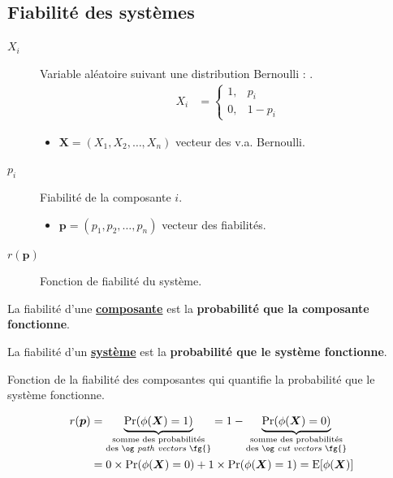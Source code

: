 \documentclass[french]{article}
\begin{document}
\begin{multicols*}{2}
\subsection{Fiabilité des systèmes}
\begin{distributions}[Notation]
\begin{description}
	\item[$X_{i}$]	Variable aléatoire suivant une distribution Bernoulli : .
		\begin{align*}
		X_{i}
		&=	\begin{cases}
			1,	&	p_{i}	\\
			0,	&	1 - p_{i}
			\end{cases}
		\end{align*}
		\begin{itemize}
		\item	$\bm{X} = (X_{1}, X_{2}, \dots, X_{n})$ vecteur des v.a. Bernoulli.
		\end{itemize}
	\item[$p_{i}$]	Fiabilité de la composante $i$.
		\begin{itemize}
		\item	$\bm{p} = (p_{1}, p_{2}, \dots, p_{n})$ vecteur des fiabilités.
		\end{itemize}
	\item[$r(\bm{p})$]	Fonction de fiabilité du système.
\end{description}
\end{distributions}

\begin{definitionNOHFILL}[Fiabilité]
La fiabilité d'une \textbf{\underline{composante}} est la \textbf{probabilité que la composante fonctionne}.

\bigskip

La fiabilité d'un \textbf{\underline{système}} est la \textbf{probabilité que le système fonctionne}.
\end{definitionNOHFILL}

\begin{definitionNOHFILLsub}
Fonction de la fiabilité des composantes  qui quantifie la probabilité que le système fonctionne.

\begin{align*}
	r(\bm{p})
	&=	\underbrace{\Pr(\phi(\bm{X}) = 1)}_{\substack{\text{somme des probabilités}\\ \text{des \og \textit{path vectors} \fg{}}}}
	=	1 - \underbrace{\Pr(\phi(\bm{X}) = 0)}_{\substack{\text{somme des probabilités}\\ \text{des \og \textit{cut vectors} \fg{}}}}	\\
	&=	0 \times \Pr(\phi(\bm{X}) = 0) + 1 \times \Pr(\phi(\bm{X}) = 1) 
	= \text{E}[\phi(\bm{X})]
\end{align*}


\end{definitionNOHFILLsub}
\end{multicols*}
\end{document}
